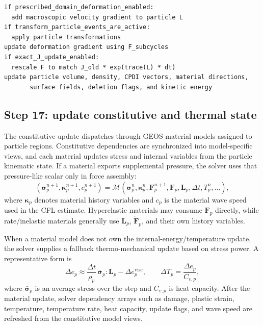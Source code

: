 \begin{lstlisting}[caption={Particle kinematic update.},basicstyle=\ttfamily\small]
if prescribed_domain_deformation_enabled:
  add macroscopic velocity gradient to particle L
if transform_particle_events_are_active:
  apply particle transformations
update deformation gradient using F_subcycles
if exact_J_update_enabled:
  rescale F to match J_old * exp(trace(L) * dt)
update particle volume, density, CPDI vectors, material directions,
       surface fields, deletion flags, and kinetic energy
\end{lstlisting}

\subsection{Step 17: update constitutive and thermal state}
\label{subsec:solver-step-17}
The constitutive update dispatches through GEOS material models assigned to particle regions.  Constitutive dependencies are synchronized into model-specific views, and each material updates stress and internal variables from the particle kinematic state.  If a material exports supplemental pressure, the solver uses that pressure-like scalar only in force assembly:
\begin{equation}
  \left(\boldsymbol{\sigma}_p^{n+1},\boldsymbol{\kappa}_p^{n+1},c_p^{n+1}\right)
  = \mathcal{M}\left(\boldsymbol{\sigma}_p^{n},\boldsymbol{\kappa}_p^{n},\mathbf{F}_p^{n+1},\dot{\mathbf{F}}_p,\mathbf{L}_p,\Delta t,T_p^n,\ldots\right),
\end{equation}
where $\boldsymbol{\kappa}_p$ denotes material history variables and $c_p$ is the material wave speed used in the CFL estimate.  Hyperelastic materials may consume $\mathbf{F}_p$ directly, while rate/inelastic materials generally use $\mathbf{L}_p$, $\dot{\mathbf{F}}_p$, and their own history variables.

When a material model does not own the internal-energy/temperature update, the solver supplies a fallback thermo-mechanical update based on stress power.  A representative form is
\begin{equation}
  \Delta e_p \approx \frac{\Delta t}{\rho_p}\,\bar{\boldsymbol{\sigma}}_p:\mathbf{L}_p - \Delta e_p^{\mathrm{visc}},
  \qquad
  \Delta T_p = \frac{\Delta e_p}{C_{v,p}},
\end{equation}
where $\bar{\boldsymbol{\sigma}}_p$ is an average stress over the step and $C_{v,p}$ is heat capacity.  After the material update, solver dependency arrays such as damage, plastic strain, temperature, temperature rate, heat capacity, update flags, and wave speed are refreshed from the constitutive model views.

